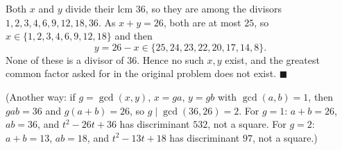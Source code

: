 Both $x$ and $y$ divide their lcm $36$, so they are among the divisors $1,2,3,4,6,9,12,18,36$. As $x+y=26$, both are at most $25$, so $x\in\{1,2,3,4,6,9,12,18\}$ and then
\[
y=26-x\in\{25,24,23,22,20,17,14,8\}.
\]
None of these is a divisor of $36$. Hence no such $x,y$ exist, and the greatest common factor asked for in the original problem does not exist. $\blacksquare$

(Another way: if $g=\gcd(x,y)$, $x=ga$, $y=gb$ with $\gcd(a,b)=1$, then $gab=36$ and $g(a+b)=26$, so $g\mid\gcd(36,26)=2$. For $g=1$: $a+b=26$, $ab=36$, and $t^2-26t+36$ has discriminant $532$, not a square. For $g=2$: $a+b=13$, $ab=18$, and $t^2-13t+18$ has discriminant $97$, not a square.)
